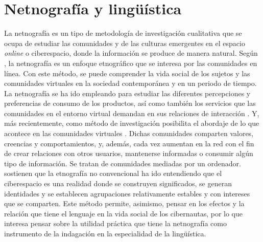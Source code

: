 \section{Netnografía y lingüística
}\label{sec-netnografiaylinguisica}

La netnografía es un tipo de metodología de investigación cualitativa
que se ocupa de estudiar las comunidades y de las culturas emergentes en
el espacio \emph{online} o ciberespacio, donde la información se produce
de manera natural. Según \textcite{kozinets1998}, la netnografía es un enfoque
etnográfico que se interesa por las comunidades en línea. Con este
método, se puede comprender la vida social de los sujetos y las
comunidades virtuales en la sociedad contemporánea y en un periodo de
tiempo. La netnografía se ha ido empleando para estudiar las diferentes
percepciones y preferencias de consumo de los productos, así como
también los servicios que las comunidades en el entorno virtual demandan
en sus relaciones de interacción \cite{casas-romeo2014,moralesvasquez2020,xun2010netnography}. Y, más recientemente, como método de
investigación posibilita el abordaje de lo que acontece en las
comunidades virtuales \cite[p. 9]{turpo2008}. Dichas comunidades comparten
valores, creencias y comportamientos, y, además, cada vez aumentan en la
red con el fin de crear relaciones con otros usuarios, mantenerse
informadas o consumir algún tipo de información. Se tratan de
comunidades mediadas por un ordenador. \textcite[p. 147]{martinez2017etnografia} sostienen que la etnografía no convencional ha ido entendiendo que
el ciberespacio es una realidad donde se construyen significados, se
generan identidades y se establecen agrupaciones relativamente estables
y con intereses que se comparten. Este método permite, asimismo, pensar
en los efectos y la relación que tiene el lenguaje en la vida social de
los cibernautas, por lo que interesa pensar sobre la utilidad práctica
que tiene la netnografía como instrumento de la indagación en la
especialidad de la lingüística.

